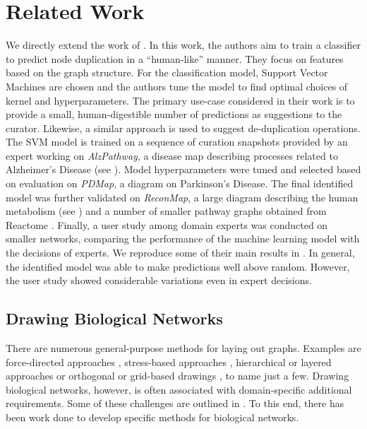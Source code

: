 \documentclass[
	fontsize=10pt, %
	twoside=false, %
	secnumdepth=1, %
  toc=indentunnumbered %
]{kaobook}
\begin{document}
\chapter{Related Work}
\label{sec:related-work}
We directly extend the work of \citeauthor{nielsen_MachineLearningSupport_2019}
\cite{nielsen_MachineLearningSupport_2019}. In this work, the authors aim to
train a classifier to predict node duplication in a ``human-like'' manner. They
focus on features based on the graph structure. For the classification model,
Support Vector Machines are chosen and the authors tune the model to find
optimal choices of kernel and hyperparameters. The primary use-case considered
in their work is to provide a small, human-digestible number of predictions as
suggestions to the curator. Likewise, a similar approach is used to suggest
de-duplication operations. The SVM model is trained on a sequence of curation
snapshots provided by an expert working on \textit{AlzPathway}, a disease map
describing processes related to Alzheimer's Disease (see ).
Model hyperparameters were tuned and selected based on evaluation on
\textit{PDMap}, a diagram on Parkinson's Disease. The final identified model was
further validated on \textit{ReconMap}, a large diagram describing the human
metabolism (see ) and a number of smaller pathway graphs obtained from Reactome
\cite{joshi-tope_ReactomeKnowledgebaseBiological_2005}. Finally, a user study
among domain experts was conducted on smaller networks, comparing the
performance of the machine learning model
with the decisions of experts. We reproduce some of their main results in
. In general, the
identified model was able to make predictions well above random. However, the
user study showed considerable variations even in expert decisions.



\section{Drawing Biological Networks}

There are numerous general-purpose methods for laying out graphs. Examples are
force-directed approaches \cite{kobourov_ForceDirectedDrawingAlgorithms_2013},
stress-based approaches \cite{gansner_GraphDrawingStress_2005}, hierarchical or
layered approaches \cite{healy_HierarchicalDrawingAlgorithms_2013} or orthogonal
or grid-based drawings \cite{duncan_PlanarOrthogonalPolyline_2013}, to name just
a few. Drawing biological networks, however, is often associated with
domain-specific additional requirements. Some of these challenges are outlined
in . To this end, there has been work done to develop
specific methods for biological networks.
\end{document}
